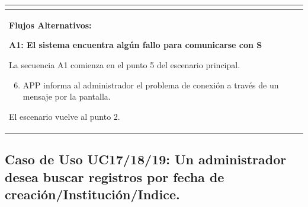 \begin{longtable}{|l|p{5.5cm}|l|p{2cm}|l|p{1.9cm}|}
{    } \\ \hline

    \multicolumn{6}{|p{15cm}|}{ \textbf{Flujos Alternativos: }
    
    \textbf{A1: El sistema encuentra algún fallo para comunicarse con S}
    
    La secuencia A1 comienza en el punto 5 del escenario principal.
    \begin{enumerate}
        \setcounter{enumi}{5}
        \item APP informa al administrador el problema de conexión a través de un mensaje por la pantalla.
    \end{enumerate}

    El escenario vuelve al punto 2.

    } \\ \hline

\end{longtable}


\subsection{Caso de Uso UC17/18/19: Un administrador desea buscar registros por fecha de creación/Institución/Indice.}

